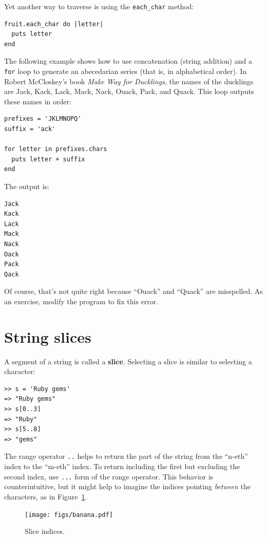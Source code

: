 \documentclass[10pt]{book}
\begin{document}
Yet another way to traverse is using the {\tt each\_char} method:

\begin{verbatim}
fruit.each_char do |letter|
  puts letter
end
\end{verbatim}

The following example shows how to use concatenation (string addition)
and a {\tt for} loop to generate an abecedarian series (that is, in
alphabetical order).  In Robert McCloskey's book {\em Make
Way for Ducklings}, the names of the ducklings are Jack, Kack, Lack,
Mack, Nack, Ouack, Pack, and Quack.  This loop outputs these names in
order:

\begin{verbatim}
prefixes = 'JKLMNOPQ'
suffix = 'ack'

for letter in prefixes.chars
  puts letter + suffix
end
\end{verbatim}
%
The output is:

\begin{verbatim}
Jack
Kack
Lack
Mack
Nack
Oack
Pack
Qack
\end{verbatim}
%
Of course, that's not quite right because ``Ouack'' and ``Quack'' are
misspelled.  As an exercise, modify the program to fix this error.



\section{String slices}
\label{slice}
  
 

A segment of a string is called a {\bf slice}.  Selecting a slice is
similar to selecting a character:

\begin{verbatim}
>> s = 'Ruby gems'
=> "Ruby gems"
>> s[0..3]
=> "Ruby"
>> s[5..8]
=> "gems"
\end{verbatim}
%
The range operator {\tt ..} helps to return the part of the string from the 
``n-eth'' index to the ``m-eth'' index.  To return including the first but
excluding the second index, use {\tt ...} form of the range operator.  This
behavior is counterintuitive, but it might
help to imagine the indices pointing {\em between} the
characters, as in Figure~\ref{fig.banana}.

\begin{figure}
\centerline
{\texttt{[image: figs/banana.pdf]}}
\caption{Slice indices.}
\label{fig.banana}
\end{figure}
\end{document}
